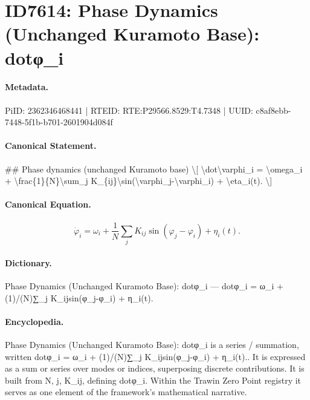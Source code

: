 \section*{ID7614: Phase Dynamics (Unchanged Kuramoto Base): dotφ\_i}
\paragraph{Metadata.}
PiID: 2362346468441 | RTEID: RTE:P29566.8529:T4.7348 | UUID: c8af8ebb-7448-5f1b-b701-2601904d084f

\paragraph{Canonical Statement.}
\#\# Phase dynamics (unchanged Kuramoto base) \textbackslash{}[ \textbackslash{}dot\textbackslash{}varphi\_i = \textbackslash{}omega\_i + \textbackslash{}frac\{1\}\{N\}\textbackslash{}sum\_j K\_\{ij\}\textbackslash{}sin(\textbackslash{}varphi\_j-\textbackslash{}varphi\_i) + \textbackslash{}eta\_i(t). \textbackslash{}]

\paragraph{Canonical Equation.}
\[
\dot\varphi_i = \omega_i + \frac{1}{N}\sum_j K_{ij}\sin(\varphi_j-\varphi_i) + \eta_i(t).
\]

\paragraph{Dictionary.}
Phase Dynamics (Unchanged Kuramoto Base): dotφ\_i — dotφ\_i = ω\_i + (1)/(N)∑\_j K\_ijsin(φ\_j-φ\_i) + η\_i(t).

\paragraph{Encyclopedia.}
Phase Dynamics (Unchanged Kuramoto Base): dotφ\_i is a series / summation, written dotφ\_i = ω\_i + (1)/(N)∑\_j K\_ijsin(φ\_j-φ\_i) + η\_i(t).. It is expressed as a sum or series over modes or indices, superposing discrete contributions. It is built from N, j, K\_ij, defining dotφ\_i. Within the Trawin Zero Point registry it serves as one element of the framework's mathematical narrative.

